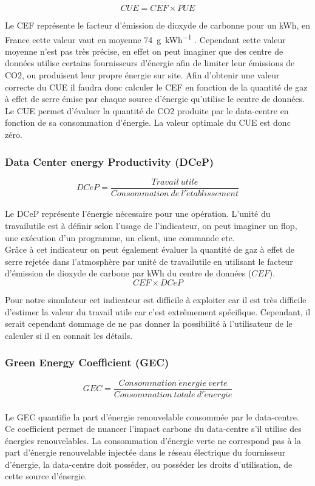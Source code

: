 \[CUE=CEF \times PUE\]

Le CEF représente le facteur d'émission de dioxyde de carbonne pour un kWh, en France cette valeur vaut en moyenne \SI[per-mode = symbol]{74}{\g\per\kWh} \cite{co2PerkWh}. Cependant cette valeur moyenne n'est pas très précise, en effet on peut imaginer que des centre de données utilise certains fournisseurs d'énergie afin de limiter leur émissions de CO2, ou produisent leur propre énergie sur site. Afin d'obtenir une valeur correcte du CUE il faudra donc calculer le CEF en fonction de la quantité de gaz à effet de serre émise par chaque source d'énergie qu'utilise le centre de données.\\

Le CUE permet d'évaluer la quantité de CO2 produite par le data-centre en fonction de sa consommation d'énergie. La valeur optimale du CUE est donc zéro.

\subsubsection{Data Center energy Productivity (DCeP)}
\[DCeP=\frac{Travail\ utile}{Consommation\ de\  l'\acute{e}tablissement}\]\\
Le DCeP représente l'énergie nécessaire pour une opération. L'unité du \gls{travailutile} est à définir selon l'usage de l'indicateur, on peut imaginer un \gls{flop}, une exécution d'un programme, un client, une commande etc.\\

Grâce à cet indicateur on peut également évaluer la quantité de gaz à effet de serre rejetée dans l'atmosphère par unité de \gls{travailutile} en utilisant le facteur d'émission de dioxyde de carbone par kWh du centre de données ($CEF$).
\[CEF \times DCeP\]

Pour notre simulateur cet indicateur est difficile à exploiter car il est très difficile d'estimer la valeur du travail utile car c'est extrêmement spécifique. Cependant, il serait cependant dommage de ne pas donner la possibilité à l'utilisateur de le calculer si il en connait les détails.

\subsubsection{Green Energy Coefficient (GEC)}
\[GEC=\frac{Consommation\ \acute{e}nergie\ verte}{Consommation\ totale\ d'\acute{e}nergie}\]\\
Le GEC quantifie la part d'énergie renouvelable consommée par le data-centre. Ce coefficient permet de nuancer l'impact carbone du data-centre s'il utilise des énergies renouvelables.
La consommation d'énergie verte ne correspond pas à la part d'énergie renouvelable injectée dans le réseau électrique du fournisseur d'énergie, la data-centre doit posséder, ou posséder les droits d'utilisation, de cette source d'énergie.

